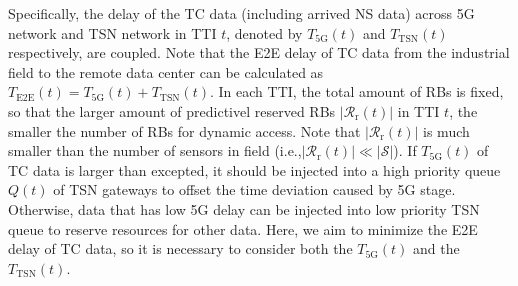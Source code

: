 \documentclass{SCIS2021}
\begin{document}
	\par {\color{blue}Specifically, the delay of the TC data (including arrived NS data) across 5G network and TSN network in TTI $t$, denoted by $T_\text{5G}(t)$ and  $T_\text{TSN}(t)$ respectively, are coupled. Note that the E2E delay of TC data from the industrial field to the  remote data center can be calculated as $T_\text{E2E}(t) = T_\text{5G}(t) + T_\text{TSN}(t)$.} In each TTI, the total amount of RBs is fixed, so that the larger amount of predictivel reserved RBs $\left|\mathcal{R}_\mathrm{r}(t)\right|$ in TTI $t$, the smaller the number of RBs for dynamic access. Note that $\left|\mathcal{R}_\mathrm{r}(t)\right|$ is much smaller than the number of sensors in field (i.e.,$\left|\mathcal{R}_\mathrm{r}(t)\right|\ll\left|\mathcal{S}\right|$). {\color{blue}If $T_\text{5G}(t)$ of TC data is larger than excepted, it should be injected into a high priority queue $Q(t)$ of TSN gateways to offset the time deviation caused by 5G stage. Otherwise, data that has low 5G delay can be injected into low priority TSN queue to reserve resources for other data. Here, we aim to minimize the E2E delay of TC data, so it is necessary to consider both the $T_\text{5G}(t)$ and the $T_\text{TSN}(t)$.}


	\par {}



\end{document}
